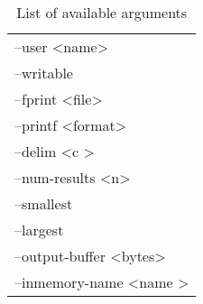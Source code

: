 \begin{table} [h]
\begin{tabular}{l}
--user \textless name\textgreater\\
--writable\\
--fprint \textless file\textgreater\\
--printf \textless format\textgreater\\
--delim \textless c \textgreater\\
--num-results \textless n\textgreater\\
--smallest\\
--largest\\
--output-buffer \textless bytes\textgreater\\
--inmemory-name \textless name \textgreater
\end{tabular}
\caption{\label{tab:widgets}List of available arguments}
\end{table}